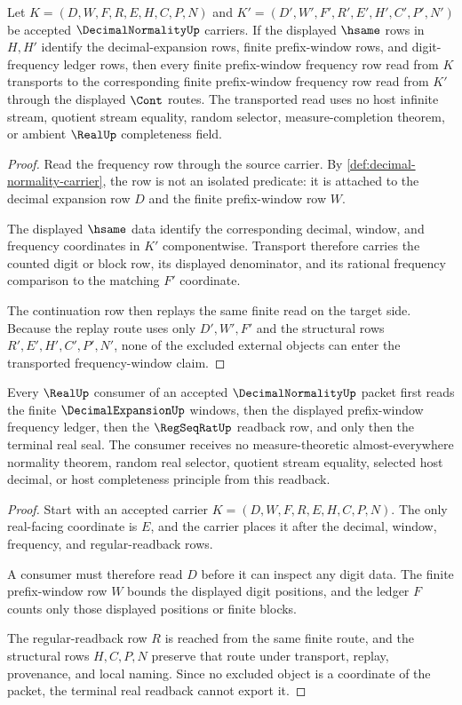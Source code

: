 \begin{theorem}\label{thm:decimal-normality-frequency-window-stability}
Let $K=(D,W,F,R,E,H,C,P,N)$ and $K'=(D',W',F',R',E',H',C',P',N')$ be accepted
$\DecimalNormalityUp$ carriers. If the displayed $\hsame$ rows in $H,H'$
identify the decimal-expansion rows, finite prefix-window rows, and
digit-frequency ledger rows, then every finite prefix-window frequency row
read from $K$ transports to the corresponding finite prefix-window frequency
row read from $K'$ through the displayed $\Cont$ routes. The transported read
uses no host infinite stream, quotient stream equality, random selector,
measure-completion theorem, or ambient $\RealUp$ completeness field.
\end{theorem}
\begin{proof}
Read the frequency row through the source carrier. By
\autoref{def:decimal-normality-carrier}, the row is not an isolated predicate:
it is attached to the decimal expansion row $D$ and the finite prefix-window
row $W$.

The displayed $\hsame$ data identify the corresponding decimal, window, and
frequency coordinates in $K'$ componentwise. Transport therefore carries the
counted digit or block row, its displayed denominator, and its rational
frequency comparison to the matching $F'$ coordinate.

The continuation row then replays the same finite read on the target side.
Because the replay route uses only $D',W',F'$ and the structural rows
$R',E',H',C',P',N'$, none of the excluded external objects can enter the
transported frequency-window claim.
\end{proof}

\begin{theorem}\label{thm:decimal-normality-real-readback}
Every $\RealUp$ consumer of an accepted $\DecimalNormalityUp$ packet first
reads the finite $\DecimalExpansionUp$ windows, then the displayed prefix-window
frequency ledger, then the $\RegSeqRatUp$ readback row, and only then the
terminal real seal. The consumer receives no measure-theoretic
almost-everywhere normality theorem, random real selector, quotient stream
equality, selected host decimal, or host completeness principle from this
readback.
\end{theorem}
\begin{proof}
Start with an accepted carrier $K=(D,W,F,R,E,H,C,P,N)$. The only real-facing
coordinate is $E$, and the carrier places it after the decimal, window,
frequency, and regular-readback rows.

A consumer must therefore read $D$ before it can inspect any digit data. The
finite prefix-window row $W$ bounds the displayed digit positions, and the
ledger $F$ counts only those displayed positions or finite blocks.

The regular-readback row $R$ is reached from the same finite route, and the
structural rows $H,C,P,N$ preserve that route under transport, replay,
provenance, and local naming. Since no excluded object is a coordinate of the
packet, the terminal real readback cannot export it.
\end{proof}

